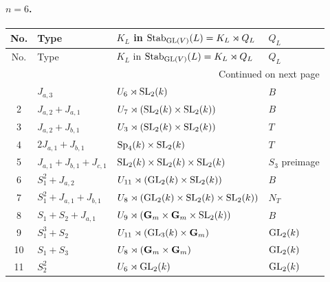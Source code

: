 \paragraph{$n=6$.}
\begin{longtable}{@{}c p{} p{} p{}@{}}
\toprule
No. & Type & $K_L$ in $\mathrm{Stab}_{\mathrm{GL}(V)}(L)=K_L\rtimes Q_L$ & $Q_L$ \\
\midrule
\endfirsthead
\toprule
No. & Type & $K_L$ in $\mathrm{Stab}_{\mathrm{GL}(V)}(L)=K_L\rtimes Q_L$ & $Q_L$ \\
\midrule
\endhead
\midrule
\multicolumn{4}{r}{Continued on next page}\\
\midrule
\endfoot
\bottomrule
\endlastfoot
1 & \(J_{a,3}\) & $U_6\rtimes \mathrm{SL}_2(k)$ & $B$ \\
2 & \(J_{a,2} + J_{a,1}\) & $U_7\rtimes (\mathrm{SL}_2(k)\times \mathrm{SL}_2(k))$ & $B$ \\
3 & \(J_{a,2} + J_{b,1}\) & $U_3\rtimes (\mathrm{SL}_2(k)\times \mathrm{SL}_2(k))$ & $T$ \\
4 & \(2J_{a,1} + J_{b,1}\) & $\mathrm{Sp}_4(k)\times \mathrm{SL}_2(k)$ & $T$ \\
5 & \(J_{a,1} + J_{b,1} + J_{c,1}\) & $\mathrm{SL}_2(k)\times \mathrm{SL}_2(k)\times \mathrm{SL}_2(k)$ & $S_3$ preimage \\
6 & \(S_1^2 + J_{a,2}\) & $U_{11}\rtimes (\mathrm{GL}_2(k)\times \mathrm{SL}_2(k))$ & $B$ \\
7 & \(S_1^2 + J_{a,1} + J_{b,1}\) & $U_8\rtimes (\mathrm{GL}_2(k)\times \mathrm{SL}_2(k)\times \mathrm{SL}_2(k))$ & $N_T$ \\
8 & \(S_1 + S_2 + J_{a,1}\) & $U_9\rtimes (\mathbf G_m\times \mathbf G_m\times \mathrm{SL}_2(k))$ & $B$ \\
9 & \(S_1^3 + S_2\) & $U_{11}\rtimes (\mathrm{GL}_3(k)\times \mathbf G_m)$ & $\mathrm{GL}_2(k)$ \\
10 & \(S_1 + S_3\) & $U_8\rtimes (\mathbf G_m\times \mathbf G_m)$ & $\mathrm{GL}_2(k)$ \\
11 & \(S_2^2\) & $U_6\rtimes \mathrm{GL}_2(k)$ & $\mathrm{GL}_2(k)$ \\
\end{longtable}

